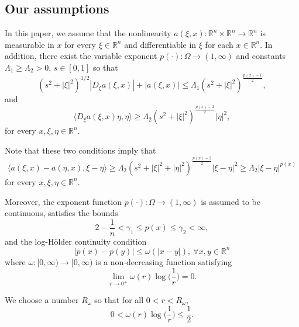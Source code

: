 \documentclass[a4paper,10pt]{amsart}
\newcommand{\pd}{p(\cdot)}
\newcommand{\px}{p(x)}
\newcommand{\f}{\frac}
\newcommand{\om}{\omega}
\newcommand{\Om}{\Omega}
\newcommand{\vc}{\infty}
\newcommand{\Rn}{\mathbb{R}^n}
\begin{document}
\subsection{Our assumptions}

In this paper, we assume that the nonlinearity $a(\xi,x): \mathbb{R}^n\times \mathbb{R}^n \to \mathbb{R}^n$  is  measurable in $x$ for every $\xi\in \Rn$ and differentiable in $\xi$ for each $x\in \Rn$. In addition,  there exist the variable exponent $\pd: \Om\to (1,\vc)$ and  constants $\Lambda_1\geq  \Lambda_2>0$, $s\in [0,1]$  so that
\begin{equation}\label{eq1-functiona}
(s^2+|\xi|^2)^{1/2}|D_\xi a(\xi,x)|+|a(\xi,x)|\leq \Lambda_1(s^2+|\xi|^2)^{\f{p(x)-1}{2}},
\end{equation}
and
\begin{equation}\label{eq1s-functiona}
\langle D_\xi a(\xi,x)\eta,\eta\rangle  \geq \Lambda_2 (s^2+|\xi|^2)^{\f{p(x)-2}{2}}|\eta|^2,
\end{equation}
for every $x, \xi, \eta \in \mathbb{R}^n$.

Note that these two conditions imply that
\begin{equation}\label{eq2-functiona}
 \langle a(\xi,x)-a(\eta,x),\xi-\eta\rangle  \geq \Lambda_2 (s^2+|\xi|^2+|\eta|^2)^{\f{p(x)-2}{2}}|\xi-\eta|^2\geq \Lambda_2|\xi-\eta|^{\px}
\end{equation}
for every $x,\xi,\eta \in \mathbb{R}^n$.

Moreover, the exponent function $\pd: \Om\to (1,\vc)$ is assumed to be continuous, satisfies the  bounds
$$
2-\f{1}{n}< \gamma_1\leq p(x)\leq \gamma_2<\vc,
$$
and the log-H\"older continuity condition
\begin{equation}
\label{cond1-px}|p(x)-p(y)|\leq \omega(|x-y|), \ \forall x,y\in \Rn
\end{equation}
where $\omega:[0,\vc)\to [0,\vc)$ is a non-decreasing function satisfying
\begin{equation}
\label{cond2-px} \lim_{r\to 0^+}\omega(r)\log\Big(\f{1}{r}\Big)=0.
\end{equation}



We choose a number $R_\om$ so that for all $0<r<R_\omega$,
\begin{equation}
\label{eq-R1}
0<\om(r)\log\Big(\f{1}{r}\Big)\leq \f{1}{2}.
\end{equation}   
\end{document}
